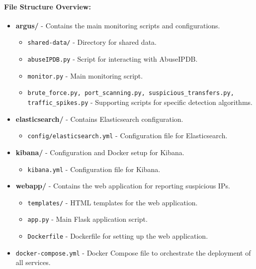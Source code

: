 \documentclass{article}
\begin{document}
    \paragraph{File Structure Overview:}
    \begin{itemize}
        \item \textbf{argus/} - Contains the main monitoring scripts and configurations.
        \begin{itemize}
            \item \texttt{shared-data/} - Directory for shared data.
            \item \texttt{abuseIPDB.py} - Script for interacting with AbuseIPDB.
            \item \texttt{monitor.py} - Main monitoring script.
            \item \texttt{brute\_force.py, port\_scanning.py, suspicious\_transfers.py, traffic\_spikes.py} - Supporting scripts for specific detection algorithms.
        \end{itemize}
        \item \textbf{elasticsearch/} - Contains Elasticsearch configuration.
        \begin{itemize}
            \item \texttt{config/elasticsearch.yml} - Configuration file for Elasticsearch.
        \end{itemize}
        \item \textbf{kibana/} - Configuration and Docker setup for Kibana.
        \begin{itemize}
            \item \texttt{kibana.yml} - Configuration file for Kibana.
        \end{itemize}
        \item \textbf{webapp/} - Contains the web application for reporting suspicious IPs.
        \begin{itemize}
            \item \texttt{templates/} - HTML templates for the web application.
            \item \texttt{app.py} - Main Flask application script.
            \item \texttt{Dockerfile} - Dockerfile for setting up the web application.
        \end{itemize}
        \item \texttt{docker-compose.yml} - Docker Compose file to orchestrate the deployment of all services.
    \end{itemize}
\end{document}
